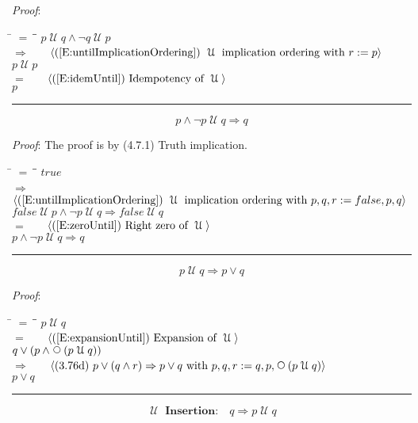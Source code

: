\documentclass[12pt, fleqn, leqno]{article}
\newcommand{\lgap}{2pt}                             %
\newcommand{\mymathindent}{24pt}                    %
\newcommand{\impl}{\ensuremath{\Rightarrow}}        %
\newcommand{\Until}{\;\mathcal{U}\;}
\newcommand{\Next}{\;\,\text{\raisebox{3.5pt}{\circle{6}}}}
\newcommand{\myqed}{\rule[-.23ex]{1.2ex}{2.0ex}}
\newcommand{\myqedtab}{\hspace{384pt}}              %
\newcommand{\Gll} {\langle}                         %
\newcommand{\Ggg} {\rangle}                         %
\newcommand{\Hint}[1]     {\ \ \ $\Gll              \mbox{#1} \Ggg$ }   %
\begin{document}
\emph{Proof}:
\begin{tabbing}
\hspace{\mymathindent} \= $= \;$ \= \myqedtab \= \kill
  \> \> $p \Until q \land \neg q \Until p$\\[\lgap]
  \> $\impl$ \> \Hint{(\ref{E:untilImplicationOrdering}) $\Until$ implication ordering with $r:=p$} \\[\lgap]
  \> \> $p\Until p$\\[\lgap]
  \> $=$  \>  \Hint{(\ref{E:idemUntil}) Idempotency of $\Until$}\\[\lgap]
  \> \> $p$ \quad \myqed
\end{tabbing}
\begin{equation}\label{E:pAndNotPUntilQ}
p\land \neg p \Until q \impl q
\end{equation}

\emph{Proof}: The proof is by (4.7.1) Truth implication.
\begin{tabbing}
\hspace{\mymathindent} \= $= \;$ \= \myqedtab \= \kill
\> \> $true$\\[\lgap]
  \> $\impl$ \> \Hint{(\ref{E:untilImplicationOrdering}) $\Until$ implication ordering with $p,q,r:= false,p,q$} \\[\lgap]
\> \> $false\Until p \land \neg p\Until q \impl false\Until q$\\[\lgap]
\> $=$ \> \Hint{(\ref{E:zeroUntil}) Right zero of $\Until$} \\[\lgap]
\> \> $p \land \neg p\Until q \impl q$ \quad \myqed
\end{tabbing}
\begin{equation}\label{E:untilImpOr}
p \Until q \impl p \lor q
\end{equation}

\emph{Proof}:
\begin{tabbing}
\hspace{\mymathindent} \= $= \;$ \= \myqedtab \= \kill
  \> \>   $p \Until q$\\[\lgap]
  \> $=$  \>  \Hint{(\ref{E:expansionUntil}) Expansion of $\Until$}\\[\lgap]
  \> \>   $q \lor (p \land \Next(p \Until q))$\\[\lgap]
  \> $\impl$  \>  \Hint{(3.76d) $p\lor (q\land r) \impl p\lor q$ with $p,q,r := q,p,\Next(p \Until q)$}\\[\lgap]
  \> \>   $p \lor q$ \quad \myqed
\end{tabbing}
\begin{equation}\label{E:untilInsertion}
\textbf{$\Until$ Insertion:}\quad q \impl p \Until q
\end{equation}
\end{document}
